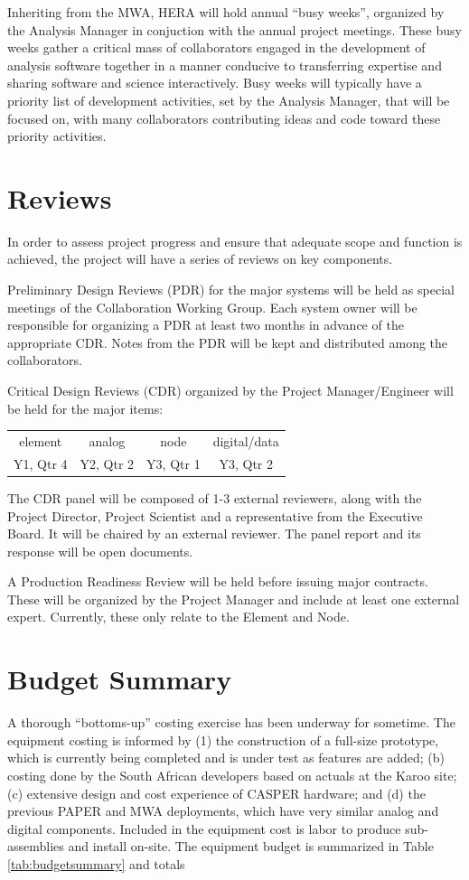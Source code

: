 \documentclass[preprint]{aastex}
\begin{document}
Inheriting from the MWA, HERA will hold annual ``busy weeks'', organized by the Analysis Manager in
conjuction with the annual project meetings.  These busy weeks gather a critical
mass of collaborators engaged in the development of analysis software together in a manner conducive to
transferring expertise and sharing software and science interactively.  Busy weeks will typically
have a priority list of development activities, set by the Analysis Manager, that will be 
focused on, with many collaborators contributing
ideas and code toward these priority activities.

\section{Reviews}
\label{sec:reviews}
In order to assess project progress and ensure that adequate scope and function is achieved,
the project will have a series of reviews on key components.

Preliminary Design Reviews (PDR) for the major systems will be held as special meetings 
of the Collaboration Working Group.  Each system owner will be responsible for organizing
a PDR at least two months in advance of the appropriate CDR.  Notes from the PDR will be
kept and distributed among the collaborators.

Critical Design Reviews (CDR) organized by the Project Manager/Engineer will be 
held for the major items:  
\begin{tabular}{| c{1in} | c{1in} | c{1in} | c{1in} |} \hline
element  & analog & node & digital/data \tabularnewline
 Y1, Qtr 4 &  Y2, Qtr 2 & Y3, Qtr 1 &  Y3, Qtr 2 \tabularnewline \hline
\end{tabular}
\vspace{.1in}

The CDR panel will be composed of 1-3 external reviewers, along with the Project
Director, Project Scientist and a representative
from the Executive Board. It will be chaired by an external reviewer. The panel
report and its response will be open documents.

A Production Readiness Review will be held before issuing major contracts.  These will
be organized by the Project Manager and include at least one external expert.  Currently, these
only relate to the Element and Node.


\section{Budget Summary}
\label{sec:budget}
A thorough ``bottoms-up'' costing exercise has been underway for sometime. The
equipment costing is informed by (1) the construction of a full-size prototype, which
is currently being completed and is under test as features are added; (b) costing
done by the South African developers based on actuals at the Karoo site; (c)
extensive design and cost experience of CASPER hardware; and (d) the previous PAPER
and MWA deployments, which have very similar analog and digital components. Included
in the equipment cost is labor to produce sub-assemblies and install on-site. The
equipment budget is summarized in Table \ref{tab:budgetsummary} and totals

\end{document}
